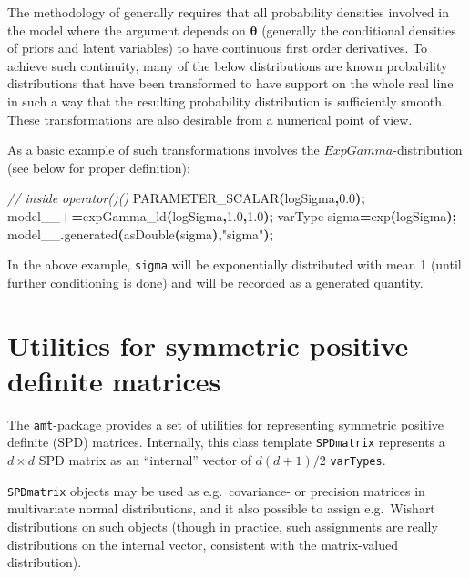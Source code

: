 \documentclass[
]{book}
\newenvironment{Shaded}{\begin{snugshade}}{\end{snugshade}}
\newcommand{\CommentTok}[1]{\textcolor[rgb]{0.56,0.35,0.01}{\textit{#1}}}
\newcommand{\FloatTok}[1]{\textcolor[rgb]{0.00,0.00,0.81}{#1}}
\newcommand{\NormalTok}[1]{#1}
\newcommand{\OperatorTok}[1]{\textcolor[rgb]{0.81,0.36,0.00}{\textbf{#1}}}
\newcommand{\StringTok}[1]{\textcolor[rgb]{0.31,0.60,0.02}{#1}}
\begin{document}
The methodology of \citet{kleppe_amt} generally requires that all probability densities involved in the model where the argument depends on \(\boldsymbol \theta\) (generally the conditional densities of priors and latent variables) to have continuous first order derivatives. To achieve such continuity, many of the below distributions are known probability distributions that have been transformed to have support on the whole real line in such a way that the resulting probability distribution is sufficiently smooth. These transformations are also desirable from a numerical point of view.

As a basic example of such transformations involves the \(ExpGamma\)-distribution (see below for proper definition):

\begin{Shaded}
\begin{Highlighting}[]
\CommentTok{// inside operator()()}
\NormalTok{PARAMETER\_SCALAR}\OperatorTok{(}\NormalTok{logSigma}\OperatorTok{,}\FloatTok{0.0}\OperatorTok{);}
\NormalTok{model\_\_}\OperatorTok{+=}\NormalTok{expGamma\_ld}\OperatorTok{(}\NormalTok{logSigma}\OperatorTok{,}\FloatTok{1.0}\OperatorTok{,}\FloatTok{1.0}\OperatorTok{);}
\NormalTok{varType sigma}\OperatorTok{=}\NormalTok{exp}\OperatorTok{(}\NormalTok{logSigma}\OperatorTok{);} 
\NormalTok{model\_\_}\OperatorTok{.}\NormalTok{generated}\OperatorTok{(}\NormalTok{asDouble}\OperatorTok{(}\NormalTok{sigma}\OperatorTok{),}\StringTok{"sigma"}\OperatorTok{);}
\end{Highlighting}
\end{Shaded}

In the above example, \texttt{sigma} will be exponentially distributed with mean 1 (until further conditioning is done) and will be recorded as a generated quantity.

\hypertarget{amt-SPD-matrix}{%
\section{Utilities for symmetric positive definite matrices}\label{amt-SPD-matrix}}

The \texttt{amt}-package provides a set of utilities for representing symmetric positive definite (SPD) matrices. Internally, this class template \texttt{SPDmatrix} represents a \(d \times d\) SPD matrix as an ``internal'' vector of \(d(d+1)/2\) \texttt{varTypes}.

\texttt{SPDmatrix} objects may be used as e.g.~covariance- or precision matrices in multivariate normal distributions, and it also possible to assign e.g.~Wishart distributions on such objects (though in practice, such assignments are really distributions on the internal vector, consistent with the matrix-valued distribution).
\end{document}
